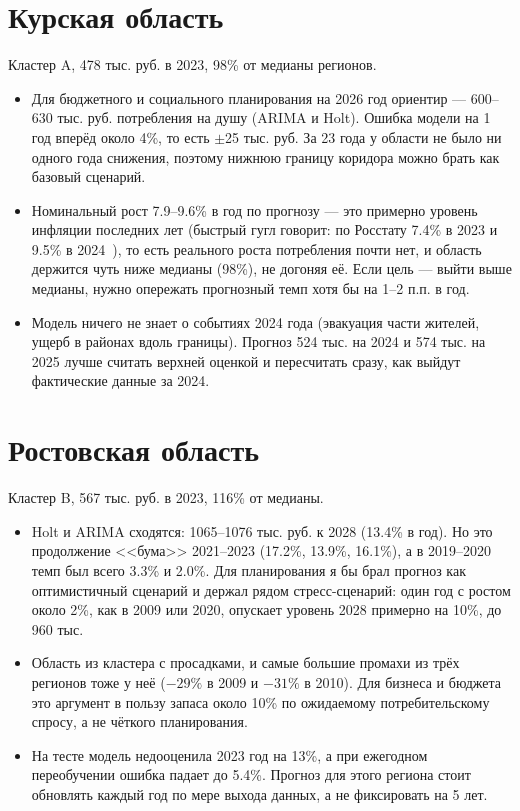 \documentclass[12pt,a4paper]{report}
\begin{document}
\section{Курская область}

Кластер A, 478 тыс. руб. в 2023, 98\% от медианы регионов.

\begin{itemize}
    \item Для бюджетного и социального планирования на 2026 год ориентир --- 600--630 тыс. руб. потребления на душу (ARIMA и Holt). Ошибка модели на 1 год вперёд около 4\%, то есть $\pm$25 тыс. руб. За 23 года у области не было ни одного года снижения, поэтому нижнюю границу коридора можно брать как базовый сценарий.
    \item Номинальный рост 7.9--9.6\% в год по прогнозу --- это примерно уровень инфляции последних лет (быстрый гугл говорит: по Росстату 7.4\% в 2023 и 9.5\% в 2024~\cite{rosstat-cpi}), то есть реального роста потребления почти нет, и область держится чуть ниже медианы (98\%), не догоняя её. Если цель --- выйти выше медианы, нужно опережать прогнозный темп хотя бы на 1--2 п.п. в год.
    \item Модель ничего не знает о событиях 2024 года (эвакуация части жителей, ущерб в районах вдоль границы). Прогноз 524 тыс. на 2024 и 574 тыс. на 2025 лучше считать верхней оценкой и пересчитать сразу, как выйдут фактические данные за 2024.
\end{itemize}

\section{Ростовская область}

Кластер B, 567 тыс. руб. в 2023, 116\% от медианы.

\begin{itemize}
    \item Holt и ARIMA сходятся: 1065--1076 тыс. руб. к 2028 (13.4\% в год). Но это продолжение <<бума>> 2021--2023 (17.2\%, 13.9\%, 16.1\%), а в 2019--2020 темп был всего 3.3\% и 2.0\%. Для планирования я бы брал прогноз как оптимистичный сценарий и держал рядом стресс-сценарий: один год с ростом около 2\%, как в 2009 или 2020, опускает уровень 2028 примерно на 10\%, до 960 тыс.
    \item Область из кластера с просадками, и самые большие промахи из трёх регионов тоже у неё ($-29\%$ в 2009 и $-31\%$ в 2010). Для бизнеса и бюджета это аргумент в пользу запаса около 10\% по ожидаемому потребительскому спросу, а не чёткого планирования.
    \item На тесте модель недооценила 2023 год на 13\%, а при ежегодном переобучении ошибка падает до 5.4\%. Прогноз для этого региона стоит обновлять каждый год по мере выхода данных, а не фиксировать на 5 лет.
\end{itemize}
\end{document}
